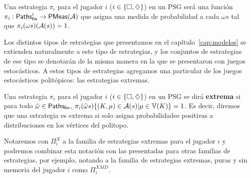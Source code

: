 \begin{definition}
	Una estrategia $\pi_i$ para el jugador $i$ ($i \in \{\square, \diamondsuit\}$) en un PSG será una función $\pi_i : \textsf{Paths}_\textsf{fin}^i \rightarrow \textsf{PMeas}(\mathcal{A})$ que asigna una medida de probabilidad a cada $\omega s$ tal que $\pi_i(\omega s)(\mathcal{A}(s)) = 1$.
\end{definition}

Los distintos tipos de estrategias que presentamos en el
capítulo~\ref{cap:modelos} se extienden naturalmente a este tipo de
estrategias, y los conjuntos de estrategias de ese tipo se denotarán de la
misma manera en la que se presentaron con juegos estocásticos. A estos tipos de
estrategias agregamos una particular de los juegos estocásticos politópicos:
las estrategias extremas.

\begin{definition}
	Una estrategia $\pi_i$ para el jugador $i$ ($i \in \{\square, \diamondsuit\}$) en un PSG se dirá \textbf{extrema} si para todo $\hat \omega \in \textsf{Paths}_\textsf{fin}$, $\pi_i(\hat \omega s)\{(K, \mu) \in \mathcal{A}(s)| \mu \in \mathbb{V}(K)\} = 1$. Es decir, diremos que una estrategia es extrema si solo asigna probabilidades positivas a distribuciones en los vértices del politopo.

	Notaremos con $\Pi_i^X$ a la familia de estrategias extremas para el jugador
	$i$ y podremos combinar esta notación con las presentadas para otras familias
	de estrategias, por ejemplo, notando a la familia de estrategias extremas,
	puras y sin memoria del jugador $i$ como $\Pi_i^{XMD}$.
\end{definition}





